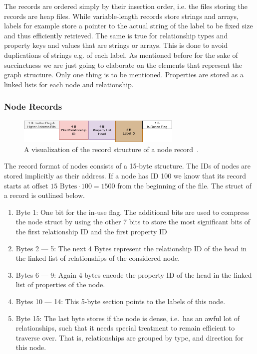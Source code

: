         The records are ordered simply by their insertion order, i.e. the files storing the records are heap files.
        While variable-length records store strings and arrays, labels for example store a pointer to the actual string of the label to be fixed size and thus efficiently retrieved.
        The same is true for relationship types and property keys and values that are strings or arrays.
        This is done to avoid duplications of strings e.g. of each label.
        As mentioned before for the sake of succinctness we are just going to elaborate on the elements that represent the graph structure. 
        Only one thing is to be mentioned.
        Properties are stored as a linked lists for each node and relationship.
        
    \subsubsection*{Node Records}
        \begin{figure}[htp]
            \begin{center}
                \includegraphics[keepaspectratio,height=0.4\textheight,width=0.7\textwidth]{img/04-databases/node_record.png}
            \end{center}
            \caption{A visualization of the record structure of a node record~\autocite{neo4jNodeRecordFormat}.}
            \label{node-record-format}
        \end{figure}
        The record format of nodes consists of a 15-byte structure.
        The IDs of nodes are stored implicitly as their address.
        If a node has ID 100 we know that its record starts at offset $15 \text{ Bytes} \cdot 100 = 1500$ from the beginning of the file.
        The struct of a record is outlined below.
        \begin{enumerate}
            \item Byte 1: One bit for the in-use flag. 
            The additional bits are used to compress the node struct by using the other 7 bits to store the most significant bits of the first relationship ID and the first property ID 
            \item Bytes 2 --- 5: The next 4 Bytes represent the relationship ID of the head in the linked list of relationships of the considered node.
            \item Bytes 6 --- 9: Again 4 bytes encode the property ID of the head in the linked list of properties of the node.
            \item Bytes 10 --- 14: This 5-byte section points to the labels of this node.
            \item Byte 15: The last byte stores if the node is dense, i.e.\ has an awful lot of relationships, such that it needs special treatment to remain efficient to traverse over.
            That is, relationships are grouped by type, and direction for this node.
        \end{enumerate}
        
